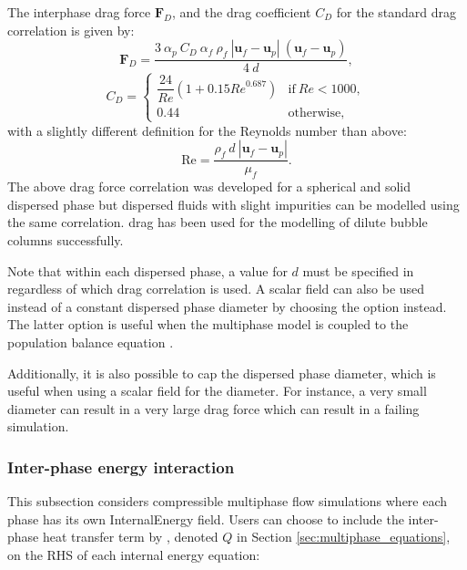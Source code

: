 The interphase drag force $\mathbf{F}_D$, and the drag coefficient $C_D$ for the standard \cite{schiller1935drag} drag correlation is given by:
\begin{equation}\label{eq:schillernaumann_drag_force}
\mathbf{F}_D = \frac{3\ \alpha_p\ C_D\ \alpha_f\ \rho_f\ |\mathbf{u}_f-\mathbf{u}_p|\ (\mathbf{u}_f-\mathbf{u}_p)}{4\ d},
\end{equation}
\begin{equation}\label{eq:schillernaumann_drag_coefficient}
C_D=
\begin{cases}
  \dfrac{24}{Re} \left( 1+0.15 {Re}^{0.687} \right)& \text{if}\ Re<1000, \\[2ex]
  0.44                                               & \text{otherwise},
\end{cases}
\end{equation}
with a slightly different definition for the Reynolds number than above:
\begin{equation}\label{eq:particle_reynolds_number_2}
\mathrm{Re} = \frac{\rho_f\ d\ |\mathbf{u}_f-\mathbf{u}_p|}{\mu_f}.
\end{equation}
The above drag force correlation was developed for a spherical and solid dispersed phase but dispersed fluids with slight impurities can be modelled using the same correlation. \cite{schiller1935drag} drag has been used for the modelling of dilute bubble columns successfully. 

Note that within each dispersed phase, a value for $d$ must be specified in  regardless of which drag correlation is used. A scalar field can also be used instead of a constant dispersed phase diameter by choosing the  option instead. The latter option is useful when the multiphase model is coupled to the population balance equation \citep{bhutani2016polydispersed}.

Additionally, it is also possible to cap the dispersed phase diameter, which is useful when using a scalar field for the diameter. For instance, a very small diameter can result in a very large drag force which can result in a failing simulation.

\subsubsection{Inter-phase energy interaction}
This subsection considers compressible multiphase flow simulations where each phase has its own InternalEnergy field. Users can choose to include the inter-phase heat transfer term by \cite{gunn1978}, denoted $Q$ in Section \ref{sec:multiphase_equations}, on the RHS of each internal energy equation:

